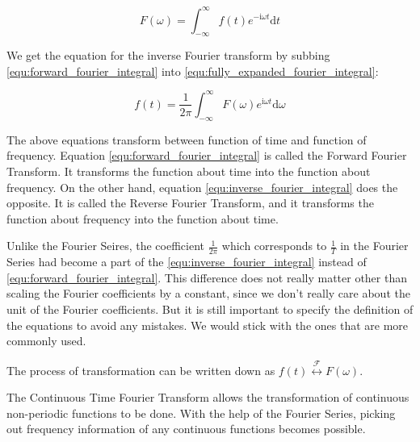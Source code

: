 \begin{equation}
    F(\omega) = \int_{-\infty}^{\infty} f(t) e^{-\mathrm{i}\omega t} \mathrm{d}t
    \label{equ:forward_fourier_integral}
\end{equation}

\indent We get the equation for the inverse Fourier transform by subbing 
{\eqref{equ:forward_fourier_integral}} into {\eqref{equ:fully_expanded_fourier_integral}}:

\begin{equation}
    f(t) = \frac{1}{2\pi} \int_{-\infty}^{\infty} F(\omega) e^{\mathrm{i}\omega t} \mathrm{d}\omega
    \label{equ:inverse_fourier_integral}
\end{equation}

\indent The above equations transform between function of time and function of frequency. 
Equation {\eqref{equ:forward_fourier_integral}} is called the Forward Fourier Transform. 
It transforms the function about time into the function about frequency. On the other hand, 
equation {\eqref{equ:inverse_fourier_integral}} does the opposite. It is called the Reverse Fourier Transform, 
and it transforms the function about frequency into the function about time. 

\indent Unlike the Fourier Seires, the coefficient $\frac{1}{2\pi}$ which corresponds 
to $\frac{1}{T}$ in the Fourier Series had become a part of the {\eqref{equ:inverse_fourier_integral}} instead of 
{\eqref{equ:forward_fourier_integral}}. 
This difference does not really matter other than scaling the Fourier coefficients by a constant, 
since we don't really care about the unit of the Fourier coefficients. 
But it is still important to specify the definition of the equations to avoid any mistakes. 
We would stick with the ones that are more commonly used.

\indent The process of transformation can be written down as 
$f(t) \stackrel{\mathcal{F}}{\longleftrightarrow} F(\omega)$.

\indent The Continuous Time Fourier Transform allows the transformation of continuous non-periodic functions to be done. 
With the help of the Fourier Series, picking out frequency information of any continuous functions becomes possible.

